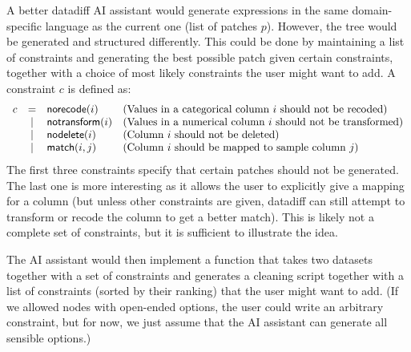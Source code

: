 \documentclass{article}
\begin{document}
A better datadiff AI assistant would generate expressions in the same domain-specific 
language as the current one (list of patches $p$). However, the tree would be generated and 
structured differently. This could be done by maintaining a list of constraints and generating
the best possible patch given certain constraints, together with a choice of most likely constraints
the user might want to add. A constraint $c$ is defined as:
%
\begin{equation*}
\begin{array}{lcll}
c &=& \textnormal{\sffamily norecode}(i) &\textnormal{(Values in a categorical column $i$ should not be recoded)}\\
  &|& \textnormal{\sffamily notransform}(i)&\textnormal{(Values in a numerical column $i$ should not be transformed)}\\
  &|& \textnormal{\sffamily nodelete}(i)&\textnormal{(Column $i$ should not be deleted)}\\
  &|& \textnormal{\sffamily match}(i,j)&\textnormal{(Column $i$ should be mapped to sample column $j$)}
\end{array}
\end{equation*}
%
The first three constraints specify that certain patches should not be generated. The last one is
more interesting as it allows the user to explicitly give a mapping for a column (but unless other
constraints are given, datadiff can still attempt to transform or recode the column to get a 
better match). This is likely not a complete set of constraints, but it is sufficient to illustrate
the idea.

The AI assistant would then implement a function that takes two datasets together with a set of 
constraints and generates a cleaning script together with a list of constraints (sorted by their
ranking) that the user might want to add. (If we allowed nodes with open-ended options, the
user could write an arbitrary constraint, but for now, we just assume that the AI assistant can
generate all sensible options.)
\end{document}
